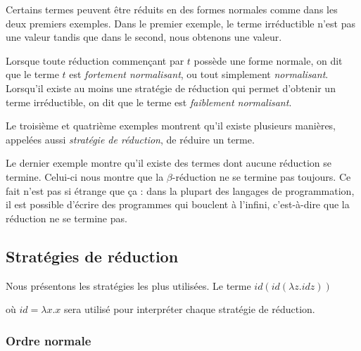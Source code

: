 Certains termes peuvent être réduits en des formes normales comme
dans les deux premiers exemples. Dans le premier exemple, le terme
irréductible n'est pas une valeur tandis que dans le second, nous obtenons
une valeur.

Lorsque toute réduction commençant par $t$ possède une forme normale, on dit que
le terme $t$ est \textit{fortement normalisant}, ou tout simplement
\textit{normalisant}. Lorsqu'il existe au moins une stratégie de réduction qui
permet d'obtenir un terme irréductible, on dit que le terme est \textit{faiblement normalisant}.

Le troisième et quatrième exemples montrent qu'il existe plusieurs manières,
appelées aussi \textit{stratégie de réduction}, de
réduire un terme.

Le dernier exemple montre qu'il existe des termes dont aucune réduction se
termine. Celui-ci nous montre que la $\beta$-réduction ne se termine pas toujours.
Ce fait n'est pas si étrange que ça : dans la plupart des langages de
programmation, il est possible d'écrire des programmes qui bouclent à l'infini,
c'est-à-dire que la réduction ne se termine pas.



\subsection{Stratégies de réduction}

Nous présentons les stratégies les plus utilisées. Le terme
\begin{math}
  id (id (\lambda z . id z))
\end{math}

où $id = \lambda x . x$ sera utilisé pour interpréter chaque stratégie de réduction.

\subsubsection*{Ordre normale}

